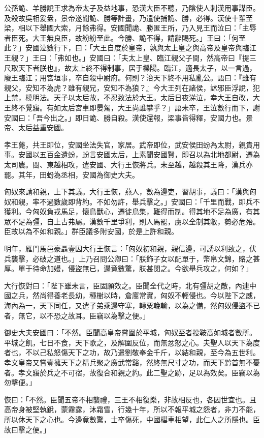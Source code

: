 \begin{pinyinscope}
公孫詭、羊勝說王求為帝太子及益地事，恐漢大臣不聽，乃陰使人刺漢用事謀臣。及殺故吳相爰盎，景帝遂聞詭、勝等計畫，乃遣使捕詭、勝，必得。漢使十輩至梁，相以下舉國大索，月餘弗得。安國聞詭、勝匿王所，乃入見王而泣曰：「主辱者臣死。大王無良臣，故紛紛至此。今勝、詭不得，請辭賜死。」王曰：「何至此？」安國泣數行下，曰：「大王自度於皇帝，孰與太上皇之與高帝及皇帝與臨江王親？」王曰：「弗如也。」安國曰：「夫太上皇、臨江親父子間，然高帝曰『提三尺取天下者朕也』，故太上終不得制事，居于櫟陽。臨江，適長太子，以一言過，廢王臨江；用宮垣事，卒自殺中尉府。何則？治天下終不用私亂公。語曰：『雖有親父，安知不為虎？雖有親兄，安知不為狼？』今大王列在諸侯，訹邪臣浮說，犯上禁，橈明法。天子以太后故，不忍致法於大王。太后日夜涕泣，幸大王自改，大王終不覺寤。有如太后宮車即晏駕，大王尚誰攀乎？」語未卒，王泣數行而下，謝安國曰：「吾今出之。」即日詭、勝自殺。漢使還報，梁事皆得釋，安國力也。景帝、太后益重安國。

孝王薨，共王即位，安國坐法失官，家居。武帝即位，武安侯田蚡為太尉，親貴用事。安國以五百金遺蚡，蚡言安國太后，上素聞安國賢，即召以為北地都尉，遷為太司農。閩、東越相攻，遣安國、大行王恢將兵。未至越，越殺其王降，漢兵亦罷。其年，田蚡為丞相，安國為御史大夫。

匈奴來請和親，上下其議。大行王恢，燕人，數為邊吏，習胡事，議曰：「漢與匈奴和親，率不過數歲即背約。不如勿許，舉兵擊之。」安國曰：「千里而戰，即兵不獲利。今匈奴負戎馬足，懷鳥獸心，遷徙鳥集，難得而制。得其地不足為廣，有其眾不足為彊，自上古弗屬。漢數千里爭利，則人馬罷，虜以全制其敝，勢必危殆。臣故以為不如和親。」群臣議多附安國，於是上許和親。

明年，雁門馬邑豪聶壹因大行王恢言：「匈奴初和親，親信邊，可誘以利致之，伏兵襲擊，必破之道也。」上乃召問公卿曰：「朕飾子女以配單于，幣帛文錦，賂之甚厚。單于待命加嫚，侵盜無已，邊竟數驚，朕甚閔之。今欲舉兵攻之，何如？」

大行恢對曰：「陛下雖未言，臣固願效之。臣聞全代之時，北有彊胡之敵，內連中國之兵，然尚得養老長幼，種樹以時，倉廩常實，匈奴不輕侵也。今以陛下之威，海內為一，天下同任，又遣子弟乘邊守塞，轉粟輓輸，以為之備，然匈奴侵盜不已者，無它，以不恐之故耳。臣竊以為擊之便。」

御史大夫安國曰：「不然。臣聞高皇帝嘗圍於平城，匈奴至者投鞍高如城者數所。平城之飢，七日不食，天下歌之，及解圍反位，而無忿怒之心。夫聖人以天下為度者也，不以己私怒傷天下之功，故乃遣劉敬奉金千斤，以結和親，至今為五世利。孝文皇帝又嘗壹擁天下之精兵聚之廣武常谿，然終無尺寸之功，而天下黔首無不憂者。孝文寤於兵之不可宿，故復合和親之約。此二聖之跡，足以為效矣。臣竊以為勿擊便。」

恢曰：「不然。臣聞五帝不相襲禮，三王不相復樂，非故相反也，各因世宜也。且高帝身被堅執銳，蒙霧露，沐霜雪，行幾十年，所以不報平城之怨者，非力不能，所以休天下之心也。今邊竟數驚，士卒傷死，中國槥車相望，此仁人之所隱也。臣故曰擊之便。」


\end{pinyinscope}
